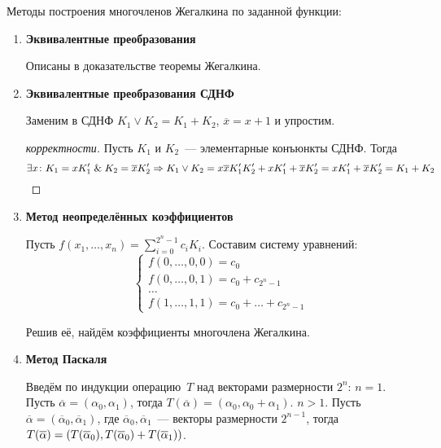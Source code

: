 Методы построения многочленов Жегалкина по заданной функции:
\begin{enumerate}
	\item \textbf{Эквивалентные преобразования}
	
	Описаны в доказательстве теоремы Жегалкина.
	
	\item \textbf{Эквивалентные преобразования СДНФ}
	
	Заменим в СДНФ $K_1 \lor K_2 = K_1 + K_2$, $\overline x = x + 1$ и упростим.
	\begin{proof}[корректности]
	Пусть $K_1$ и $K_2$~--- элементарные конъюнкты СДНФ.
	Тогда
	\begin{equation*}
	\exists x \colon K_1 = x K_1' \mathrel{\&} K_2 = \overline x K_2' \Rightarrow
	K_1 \lor K_2 =
	x \overline x K_1' K_2' + x K_1' + \overline x K_2' =
	x K_1' + \overline x K_2' =
	K_1 + K_2
	\end{equation*}
	\end{proof}
	
	\item {} \textbf{Метод неопределённых коэффициентов}
	
	Пусть $f(x_1, \ldots, x_n) = \sum\limits_{i=0}^{2^n-1} c_i K_i$.
	Составим систему уравнений:
	\begin{equation*}
	\begin{cases}
	f(0, \ldots, 0, 0) = c_0 \\
	f(0, \ldots, 0, 1) = c_0 + c_{2^n-1} \\
	\ldots \\
	f(1, \ldots, 1, 1) = c_0 + \ldots + c_{2^n-1}
	\end{cases}
	\end{equation*}
	
	Решив её, найдём коэффициенты многочлена Жегалкина.
	
	\item {} \textbf{Метод Паскаля}
	
	Введём по индукции операцию~$T$ над векторами размерности $2^n$:
		\indbase $n = 1$.
		Пусть $\overline\alpha = (\alpha_0, \alpha_1)$, тогда $T(\overline\alpha) = (\alpha_0, \alpha_0 + \alpha_1)$.
		\indstep $n > 1$.
		Пусть $\overline\alpha = (\overline\alpha_0, \overline\alpha_1)$, где
		$\overline\alpha_0, \overline\alpha_1$~--- векторы размерности $2^{n-1}$, тогда
		$T(\overline\alpha) \opbr= (T(\overline\alpha_0), T(\overline\alpha_0) + T(\overline\alpha_1))$.
		\indend
		

\end{enumerate}
